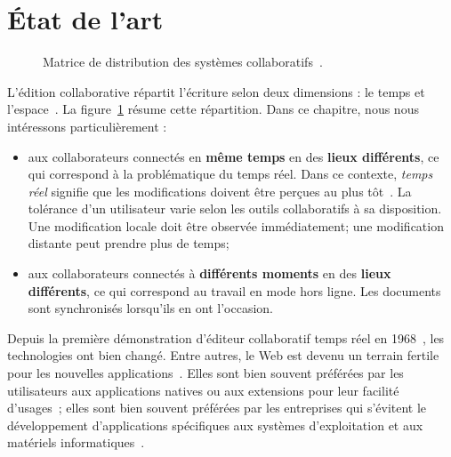 
\section{État de l'art}
\label{editor:sec:stateoftheart}

\begin{figure}
  \begin{center}
    
    \caption[Matrice de distribution des systèmes collaboratifs] {
      \label{editor:fig:groupware} Matrice de distribution des systèmes
      collaboratifs~\cite{johansen1988groupware}.}
  \end{center}
\end{figure}


L'édition collaborative répartit l'écriture selon deux dimensions : le temps et
l'espace~\cite{desanctis1987foundation, grudin1994computersupported,
  johansen1988groupware}.  La figure~\ref{editor:fig:groupware} résume cette
répartition. Dans ce chapitre, nous nous intéressons particulièrement :
\begin{itemize}
\item aux collaborateurs connectés en \textbf{même temps} en des \textbf{lieux
    différents}, ce qui correspond à la problématique du temps réel. Dans ce
  contexte, \emph{temps réel} signifie que les modifications doivent être
  perçues au plus tôt~\cite{ellis1989concurrency}. La tolérance d'un utilisateur
  varie selon les outils collaboratifs à sa disposition. Une modification locale
  doit être observée immédiatement; une modification distante peut prendre plus
  de temps;
\item aux collaborateurs connectés à \textbf{différents moments} en des
  \textbf{lieux différents}, ce qui correspond au travail en mode hors
  ligne. Les documents sont synchronisés lorsqu'ils en ont l'occasion.
\end{itemize}

Depuis la première démonstration d'éditeur collaboratif temps réel en
1968~\cite{engelbart1968research}, les technologies ont bien changé. Entre
autres, le Web est devenu un terrain fertile pour les nouvelles
applications~\cite{lautamaki2013development}. Elles sont bien souvent préférées
par les utilisateurs aux applications natives ou aux extensions pour leur
facilité d'usages~\cite{mogan2010impact}; elles sont bien souvent préférées par
les entreprises qui s'évitent le développement d'applications spécifiques aux
systèmes d'exploitation et aux matériels informatiques~\cite{mogan2010impact}.

